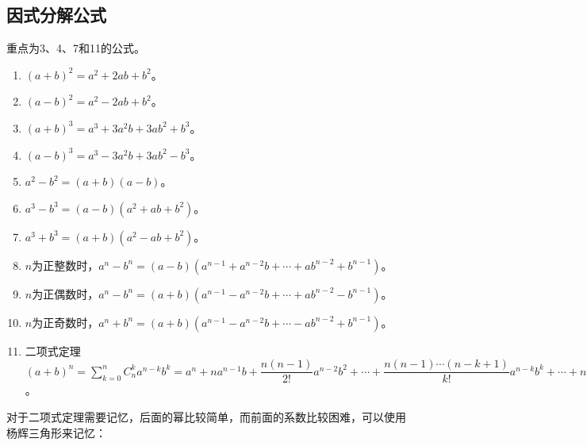 \documentclass[UTF8, 12pt]{ctexart}
\begin{document}
\subsection{因式分解公式}

重点为3、4、7和11的公式。

\begin{enumerate}
    \item $(a+b)^2=a^2+2ab+b^2$。
    \item $(a-b)^2=a^2-2ab+b^2$。
    \item $(a+b)^3=a^3+3a^2b+3ab^2+b^3$。
    \item $(a-b)^3=a^3-3a^2b+3ab^2-b^3$。
    \item $a^2-b^2=(a+b)(a-b)$。
    \item $a^3-b^3=(a-b)(a^2+ab+b^2)$。
    \item $a^3+b^3=(a+b)(a^2-ab+b^2)$。
    \item $n$为正整数时，$a^n-b^n=(a-b)(a^{n-1}+a^{n-2}b+\cdots+ab^{n-2}+b^{n-1})$。
    \item $n$为正偶数时，$a^n-b^n=(a+b)(a^{n-1}-a^{n-2}b+\cdots+ab^{n-2}-b^{n-1})$。
    \item $n$为正奇数时，$a^n+b^n=(a+b)(a^{n-1}-a^{n-2}b+\cdots-ab^{n-2}+b^{n-1})$。
    \item 二项式定理$(a+b)^n=\sum_{k=0}^nC_n^ka^{n-k}b^k=a^n+na^{n-1}b+\dfrac{n(n-1)}{2!}a^{n-2}b^2+\cdots+\dfrac{n(n-1)\cdots(n-k+1)}{k!}a^{n-k}b^k+\cdots+nab^{n-1}+b^n$。
\end{enumerate}

对于二项式定理需要记忆，后面的幂比较简单，而前面的系数比较困难，可以使用杨辉三角形来记忆：
\end{document}
